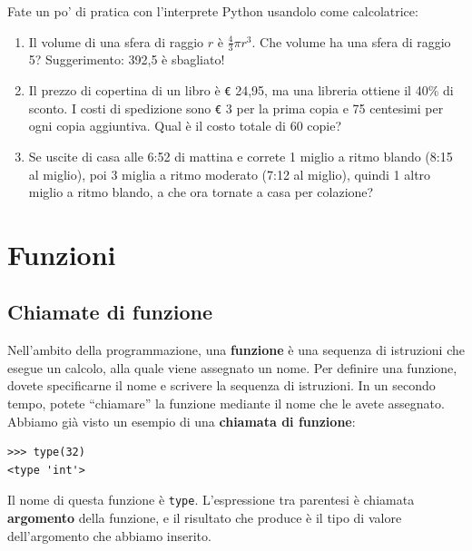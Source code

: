 \documentclass[10pt]{book}
\begin{document}
\vspace{0.2in}
\begin{exercise}

Fate un po' di pratica con l'interprete Python usandolo come calcolatrice:

\begin{enumerate}

\item Il volume di una sfera di raggio $r$ è $\frac{4}{3} \pi r^3$.
  Che volume ha una sfera di raggio 5? Suggerimento: 392,5 è sbagliato!

\item Il prezzo di copertina di un libro è \verb"€" 24,95, ma una libreria ottiene il
  40\% di sconto. I costi di spedizione sono \verb"€" 3 per la prima copia e 75 centesimi per ogni copia aggiuntiva. Qual è il costo totale di 60 copie?

\item Se uscite di casa alle 6:52 di mattina e correte 1 miglio a ritmo blando (8:15 al miglio), poi 3 miglia a ritmo moderato (7:12 al miglio), quindi 1 altro miglio a ritmo blando, a che ora tornate a casa per colazione?

\end{enumerate}
\end{exercise}


\chapter{Funzioni}
\label{funcchap}

\section{Chiamate di funzione}
\label{functionchap}

Nell'ambito della programmazione, una {\bf funzione} è una sequenza di istruzioni che esegue un calcolo, alla quale viene assegnato un nome.  Per definire una funzione, dovete specificarne il nome e scrivere la sequenza di istruzioni. In un secondo tempo, potete ``chiamare'' la funzione mediante il nome che le avete assegnato. 
Abbiamo già visto un esempio di una {\bf chiamata di funzione}:

\begin{verbatim}
>>> type(32)
<type 'int'>
\end{verbatim}
%
Il nome di questa funzione è {\tt type}. L'espressione tra parentesi è chiamata {\bf argomento} della funzione, e il risultato che produce è il tipo di valore dell'argomento che abbiamo inserito.
\end{document}
